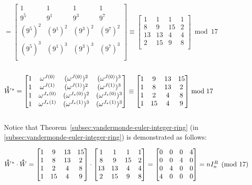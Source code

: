 $ = \begin{bmatrix}
1 & 1 & 1 & 1\\
9^{5} & 9^{1} & 9^{3} & 9^{7}\\
(9^{5})^2 & (9^{1})^2 & (9^{3})^2 & (9^{7})^2\\
(9^{5})^3 & (9^{1})^3 & (9^{3})^3 & (9^{7})^3\\
\end{bmatrix} \equiv \begin{bmatrix}
1 & 1 & 1 & 1\\
8 & 9 & 15 & 2\\
13 & 13 & 4 & 4\\
2 & 15 & 9 & 8\\
\end{bmatrix} \bmod{17}$ 

$ $ 

$\hathat W^* = \begin{bmatrix}
1 & \omega^{J(0)} & (\omega^{J(0)})^2 & (\omega^{J(0)})^3\\
1 & \omega^{J(1)} & (\omega^{J(1)})^2 & (\omega^{J(1)})^3\\
1 & \omega^{J_*(0)} & (\omega^{J_*(0)})^2 & (\omega^{J_*(0)})^3\\
1 & \omega^{J_*(1)} & (\omega^{J_*(1)})^3 & (\omega^{J_*(1)})^3\\
\end{bmatrix} \equiv \begin{bmatrix}
1 & 9 & 13 & 15\\
1 & 8 & 13 & 2\\
1 & 2 & 4 & 8\\
1 & 15 & 4 & 9\\
\end{bmatrix}  \bmod{17}$

$ $

Notice that Theorem~\ref*{subsec:vandermonde-euler-integer-ring} (in \autoref{subsec:vandermonde-euler-integer-ring}) is demonstrated as follows:

$\hathat{W}^* \cdot \hathat{W} = \begin{bmatrix}
1 & 9 & 13 & 15\\
1 & 8 & 13 & 2\\
1 & 2 & 4 & 8\\
1 & 15 & 4 & 9\\
\end{bmatrix} \cdot \begin{bmatrix}
1 & 1 & 1 & 1\\
8 & 9 & 15 & 2\\
13 & 13 & 4 & 4\\
2 & 15 & 9 & 8\\
\end{bmatrix} = \begin{bmatrix}
0 & 0 & 0 & 4\\
0 & 0 & 4 & 0\\
0 & 4 & 0 & 0\\
4 & 0 & 0 & 0\\
\end{bmatrix} = n I_n^{R} \pmod{17}$

